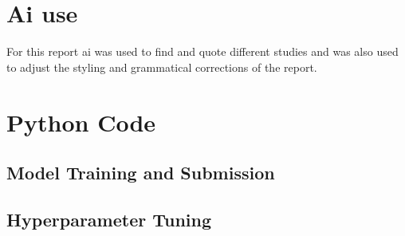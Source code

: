 \documentclass[11pt,a4paper]{article}
\begin{document}
\section{Ai use}
For this report ai was used to find and quote different studies and was also used to adjust the styling and grammatical corrections of the report.






\clearpage
\appendix
\section{Python Code}

\subsection{Model Training and Submission}


\clearpage
\subsection{Hyperparameter Tuning}

\end{document}
